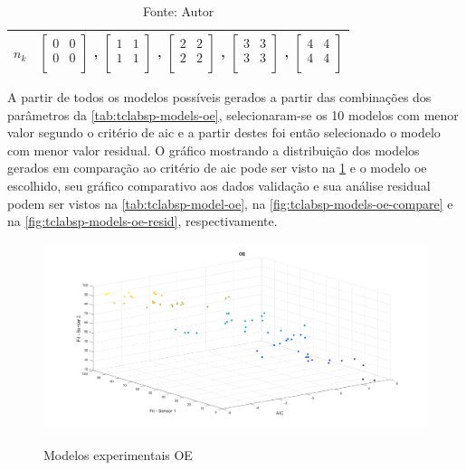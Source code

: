 \begin{table}[h]
\begin{tabular}{c|c}
		$n_k$			&
							$ \begin{bmatrix}	0	&	0	\\	0	&	0	\\	\end{bmatrix} $	,		
							$ \begin{bmatrix}	1	&	1	\\	1	&	1	\\	\end{bmatrix} $	,		
							$ \begin{bmatrix}	2	&	2	\\	2	&	2	\\	\end{bmatrix} $	,		
							$ \begin{bmatrix}	3	&	3	\\	3	&	3	\\	\end{bmatrix} $	,		
							$ \begin{bmatrix}	4	&	4	\\	4	&	4	\\	\end{bmatrix} $		\\ \bottomrule
	\end{tabular}
	\caption*{Fonte: Autor}
\end{table}

A partir de todos os modelos possíveis gerados a partir das combinações dos parâmetros da \cref{tab:tclabsp-models-oe},
selecionaram-se os 10 modelos com menor valor segundo o critério de \acrshort{aic} e a partir destes foi então
selecionado o modelo com menor valor residual.
O gráfico mostrando a distribuição dos modelos gerados em comparação ao critério de \acrshort{aic} pode ser
visto na \cref{fig:tclabsp-models-oe} e o modelo \acrshort{oe} escolhido, seu gráfico comparativo aos dados validação
e sua análise residual podem ser vistos na \cref{tab:tclabsp-model-oe}, na \cref{fig:tclabsp-models-oe-compare} e na
\cref{fig:tclabsp-models-oe-resid}, respectivamente.

\begin{figure}[h]
	\caption{Modelos experimentais OE}
	\begin{center}
		\includegraphics[width=1.00\textwidth]{./5_images/tclabsp-models-OE.png} 
		\label{fig:tclabsp-models-oe}
	\end{center}
	\centering
\end{figure}

